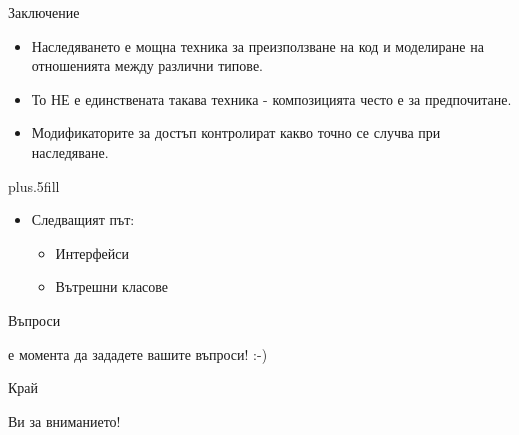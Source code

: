 \documentclass{beamer}
\begin{document}
\begin{frame}{Заключение}
  \transdissolve
  \begin{itemize}
  \item
    Наследяването \alert{е мощна техника за преизползване на код и
      моделиране на отношенията между различни типове}.
  \item
    То НЕ е единствената такава техника - композицията често е за предпочитане.
  \item
    Модификаторите за достъп контролират какво точно се случва при наследяване.
  \end{itemize}
  
  \vskip0pt plus.5fill
  \begin{itemize}
  \item
    Следващият път:
    \begin{itemize}
    \item
      Интерфейси
    \item
      Вътрешни класове
    \end{itemize}
  \end{itemize}
\end{frame}

\begin{frame}{Въпроси}
  \transdissolve
  \begin{center}
     е момента да зададете вашите въпроси! :-)
  \end{center}
\end{frame}

\begin{frame}{Край}
  \transdissolve
  \begin{center}
     Ви за вниманието!
  \end{center}
\end{frame}
\end{document}
